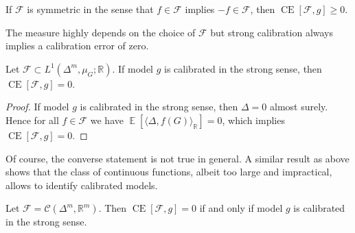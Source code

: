 \documentclass{article}
\DeclareMathOperator{\Expect}{\mathbb{E}}
\DeclareMathOperator{\measure}{CE}
\begin{document}
\begin{remark}\label{remark:positive}
  If $\mathcal{F}$ is symmetric in the sense that $f \in \mathcal{F}$ implies
  $-f \in \mathcal{F}$, then $\measure[\mathcal{F}, g] \geq 0$.
\end{remark}

The measure highly depends on the choice of $\mathcal{F}$ but strong calibration
always implies a calibration error of zero.

\begin{theorem}\label{thm:ce_zero}
  Let $\mathcal{F} \subset L^1(\Delta^m,\mu_G;\mathbb{R})$. If model $g$ is
  calibrated in the strong sense, then $\measure[\mathcal{F}, g] = 0$.
\end{theorem}

\begin{proof}
  If model $g$ is calibrated in the strong sense, then $\Delta = 0$ almost
  surely. Hence for all $f \in \mathcal{F}$ we have
  $\Expect[\langle \Delta, f(G)\rangle_{\mathbb{R}}] = 0$, which implies
  $\measure[\mathcal{F}, g] = 0$.
\end{proof}

Of course, the converse statement is not true in general. A similar result as
above shows that the class of continuous functions, albeit too large and
impractical, allows to identify calibrated models.

\begin{theorem}\label{thm:ce_continuous}
  Let $\mathcal{F} = \mathcal{C}(\Delta^m, \mathbb{R}^m)$. Then
  $\measure[\mathcal{F}, g] = 0$ if and only if model $g$ is calibrated in the
  strong sense.
\end{theorem}
\end{document}
